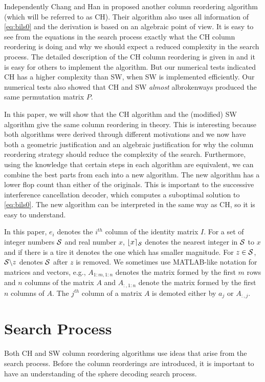\documentclass[conference]{IEEEtran}
\begin{document}
Independently  Chang and Han in \cite{ChaH05} proposed
another column reordering algorithm (which will be referred to as  CH).
Their algorithm also uses all information of \eqref{eq:bils0} and the derivation
is based on an algebraic point of view. It is  easy to see from the equations in
the search process exactly what the CH column reordering is doing and why we
should expect a reduced complexity in the search process. The detailed
description of the CH column reordering is given in \cite{ChaH05} and it is easy
for others to implement the algorithm.
But our numerical tests indicated CH has a  higher complexity than SW, when SW
is implemented efficiently.
Our numerical tests also showed that CH and SW {\em almost} albrokenways   
produced the same permutation matrix $P$.

In this paper, we will show that the CH algorithm and the  (modified)  SW algorithm give the same
column reordering in theory. 
This is interesting because both algorithms were derived through different motivations
and we now have both a geometric justification and an algebraic justification 
for why the column reordering strategy should reduce the complexity of the search.
Furthermore, using the knowledge that certain steps in each algorithm are equivalent,
we can combine the best parts from each into a new algorithm. The new algorithm
has a lower flop count than either of the originals.
This is important to the successive interference cancellation decoder, 
which computes a suboptimal solution to \eqref{eq:bils0}.
The new algorithm can be interpreted in the same way as CH,
so it is easy to understand.

In this paper,  $e_i$ denotes the $i^{th}$ column of the identity matrix $I$.
For a set of integer numbers ${\cal S}$ and real number $x$, 
$\lfloor x\rceil_{\cal S}$ denotes the nearest integer in  ${\cal S}$
to $x$ and if there is a tire it denotes the one which has smaller magnitude.
For $z\in{\cal S}$, ${\cal S}\backslash z$ denotes ${\cal S}$ after $z$ is removed.   
We sometimes use MATLAB-like notation for matrices and vectors, e.g.,
$A_{1:m,1:n}$ denotes the matrix formed by the first $m$ rows
and $n$ columns of the matrix $A$ and $A_{:,1:n}$ denote the matrix formed by
the first $n$ columns of $A$.
The $j^{th}$ column of a matrix $A$ is demoted either by $a_j$ or $A_{:,j}$.

\section{Search Process}
\label{sec:Search}
Both CH and SW column reordering algorithms use ideas that arise from the search
process. 
Before the column reorderings are introduced, it is
important to have an understanding of the sphere decoding search process. 
\end{document}
